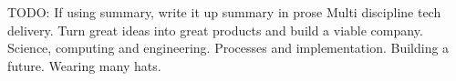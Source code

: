 

\begin{cvparagraph}

TODO: If using summary, write it up summary in prose
Multi discipline tech delivery. Turn great ideas into great products and build a viable company. Science, computing and engineering. Processes and implementation. Building a future. Wearing many hats.
\end{cvparagraph}